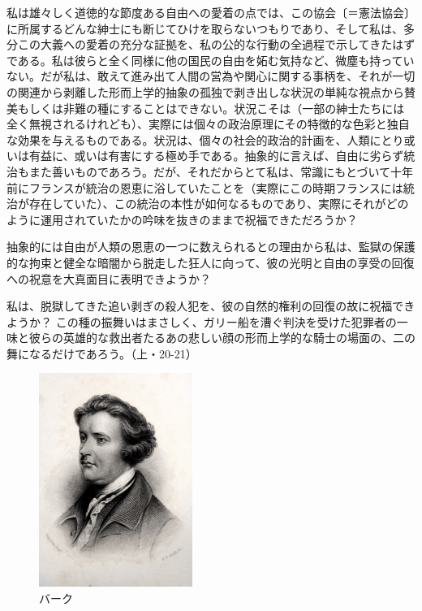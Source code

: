 私は雄々しく道徳的な節度ある自由への愛着の点では、この協会〔＝憲法協会〕に所属するどんな紳士にも断じてひけを取らないつもりであり、そして私は、多分この大義への愛着の充分な証拠を、私の公的な行動の全過程で示してきたはずである。私は彼らと全く同様に他の国民の自由を妬む気持など、微塵も持っていない。だが私は、敢えて進み出て人間の営為や関心に関する事柄を、それが一切の関連から剥離した形而上学的抽象の孤独で剥き出しな状況の単純な視点から賛美もしくは非難の種にすることはできない。状況こそは（一部の紳士たちには全く無視されるけれども）、実際には個々の政治原理にその特徴的な色彩と独自な効果を与えるものである。状況は、個々の社会的政治的計画を、人類にとり或いは有益に、或いは有害にする極め手である。抽象的に言えば、自由に劣らず統治もまた善いものであろう。だが、それだからとて私は、常識にもとづいて十年前にフランスが統治の恩恵に浴していたことを（実際にこの時期フランスには統治が存在していた）、この統治の本性が如何なるものであり、実際にそれがどのように運用されていたかの吟味を抜きのままで祝福できただろうか？

抽象的には自由が人類の恩恵の一つに数えられるとの理由から私は、監獄の保護的な拘束と健全な暗闇から脱走した狂人に向って、彼の光明と自由の享受の回復への祝意を大真面目に表明できようか？

私は、脱獄してきた追い剥ぎの殺人犯を、彼の自然的権利の回復の故に祝福できようか？
この種の振舞いはまさしく、ガリー船を漕ぐ判決を受けた犯罪者の一味と彼らの英雄的な救出者たるあの悲しい顔の形而上学的な騎士の場面の、二の舞になるだけであろう。（上・20-21）



     \begin{figure}[htbp]
       \centering
         \includegraphics[width=50mm]{images/burke.jpg}
       \caption{バーク}
     \end{figure}



\subsection{}




